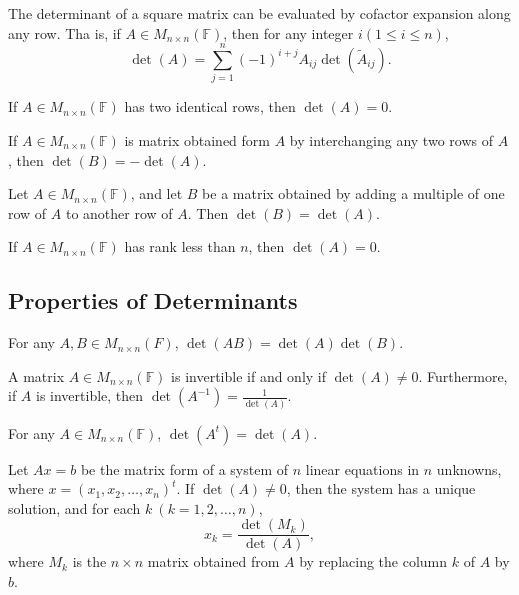 \newpage
\begin{theorem}
    The determinant of a square matrix can be evaluated by cofactor expansion along any row. Tha is, if \( A \in M_{n \times n}(\mathbb{F}) \), then for any integer \( i(1 \leq i \leq n ) \),
    \[
    \det (A) = \sum_{j=1}^{n} (-1)^{i+j} A_{ij} \det (\tilde{A}_{ij}).
    \]
\end{theorem}
\vspace{3cm}
\begin{corollary}
    If \( A \in M_{n \times n}(\mathbb{F}) \) has two identical rows, then \(\det (A) = 0\).
\end{corollary}
\vspace{5cm}
\begin{theorem}
    If \( A \in M_{n \times n}(\mathbb{F}) \) is matrix obtained form \(A\) by interchanging any two rows of \(A\), then \(\det (B) = - \det (A)\).
\end{theorem}
\newpage
\begin{theorem}
    Let \( A \in M_{n \times n}(\mathbb{F}) \), and let \( B \) be a matrix obtained by adding a multiple of one row of \(A\) to another row of \(A\). Then \(\det (B) = \det (A)\).
\end{theorem}
\vspace{3cm}
\begin{corollary}
    If \( A \in M_{n \times n}(\mathbb{F}) \) has rank less than \(n\), then \(\det (A) = 0\).
\end{corollary}
\vspace{3cm}
\subsection{Properties of Determinants}
\begin{theorem}
    For any \(A,B \in M_{n \times n}(F)\), \( \det (AB) = \det (A) \det (B) \).
\end{theorem}
\newpage
\begin{corollary}
    A matrix \(A \in M_{n \times n}(\mathbb{F})\) is invertible if and only if \(\det (A) \neq 0\).
    Furthermore, if \(A\) is invertible, then \(\det (A^{-1}) = \frac{1}{\det (A)}\).
\end{corollary}
\vspace{3cm}
\begin{theorem}
    For any \(A \in M_{n \times n}(\mathbb{F})\), \(\det (A^t) = \det (A)\).
\end{theorem}
\vspace{5cm}
\begin{theorem}
    Let \( Ax = b\) be the matrix form of a system of \( n\) linear equations in \( n \) unknowns, where \( x = (x_1, x_2, \dots , x_n)^t \).
    If \(\det (A) \neq 0\), then the system has a unique solution, and for each \(k\ (k = 1, 2, \dots , n)\),
    \[
    x_k = \frac{\det (M_k)}{\det (A)},
    \]
    where \(M_k\) is the \(n \times n \) matrix obtained from \(A\) by replacing the column \(k\) of \(A\) by \(b\).
\end{theorem}
\vspace{5cm}
